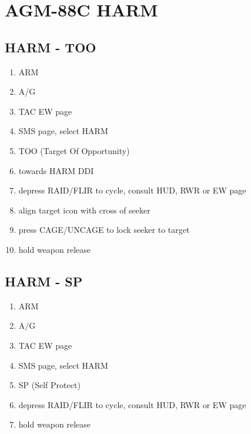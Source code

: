 \documentclass[fontInter, widesubsec]{TechCheck}
\begin{document}
	\section{AGM-88C HARM}

	\subsection{HARM - TOO}
	\begin{enumerate}
		\item {}\dotfill ARM
		\item {}\dotfill A/G
		\item {}\dotfill TAC EW page
		\item {}\dotfill SMS page, select HARM
		\item {}\dotfill TOO (Target Of Opportunity)
		\item {}\dotfill towards HARM DDI
		\item {}\dotfill depress RAID/FLIR to cycle, consult HUD, RWR or EW page
		\item {}\dotfill align target icon with cross of seeker
		\item {}\dotfill press CAGE/UNCAGE to lock seeker to target
		\item {}\dotfill hold weapon release
	\end{enumerate}

	\subsection{HARM - SP}
	\begin{enumerate}
		\item {}\dotfill ARM
		\item {}\dotfill A/G
		\item {}\dotfill TAC EW page
		\item {}\dotfill SMS page, select HARM
		\item {}\dotfill SP (Self Protect)
		\item {}\dotfill depress RAID/FLIR to cycle, consult HUD, RWR or EW page
		\item {}\dotfill hold weapon release
	\end{enumerate}
\end{document}
